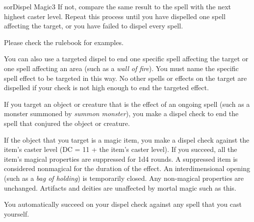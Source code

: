 \begin{spellcard}{sor}{Dispel Magic}{3}
  If not, compare the same result to the spell with the next highest caster level.
  Repeat this process until you have dispelled one spell affecting the target,
  or you have failed to dispel every spell.

  Please check the rulebook for examples.

  You can also use a targeted dispel to end one specific spell affecting the target or one spell affecting an area
  (such as a \emph{wall of fire}).
  You must name the specific spell effect to be targeted in this way.
  No other spells or effects on the target are dispelled if your check is not high enough to end the targeted effect.

  If you target an object or creature that is the effect of an ongoing spell
  (such as a monster summoned by \emph{summon monster}),
  you make a dispel check to end the spell that conjured the object or creature.

  If the object that you target is a magic item,
  you make a dispel check against the item's caster level (DC = 11 + the item's caster level).
  If you succeed, all the item's magical properties are suppressed for 1d4 rounds.
  A suppressed item is considered nonmagical for the duration of the effect.
  An interdimensional opening (such as a \emph{bag of holding}) is temporarily closed.
  Any non-magical properties are unchanged.
  Artifacts and deities are unaffected by mortal magic such as this.

  You automatically succeed on your dispel check against any spell that you cast yourself.

\end{spellcard}
